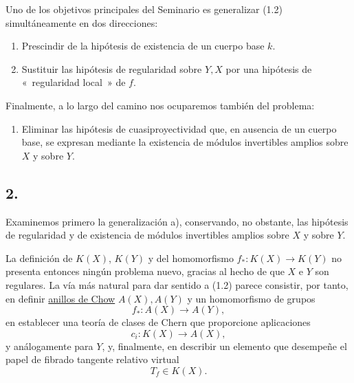 Uno de los objetivos principales del Seminario es generalizar (1.2)
simultáneamente en dos direcciones:
\begin{enumerate}[label=\alph*)]
\item Prescindir de la hipótesis de existencia de un cuerpo base $k$.
\item Sustituir las hipótesis de regularidad sobre $Y,X$ por una hipótesis de
«~regularidad local~» de $f$.
\end{enumerate}
Finalmente, a lo largo del camino nos ocuparemos también del problema:
\begin{enumerate}[label=\alph*),start=3]
\item Eliminar las hipótesis de cuasiproyectividad que, en ausencia de un
cuerpo base, se expresan mediante la existencia de módulos invertibles
amplios sobre $X$ y sobre $Y$.
\end{enumerate}

\subsection*{2.}
Examinemos primero la generalización a), conservando, no obstante, las
hipótesis de regularidad y de existencia de módulos invertibles amplios sobre
$X$ y sobre $Y$.

La definición de $K(X)$, $K(Y)$ y del homomorfismo $f_*:K(X)\to K(Y)$ no
presenta entonces ningún problema nuevo, gracias al hecho de que $X$ e $Y$
son regulares. La vía más natural para dar sentido a (1.2) parece consistir,
por tanto, en definir \underline{anillos de Chow} $A(X),A(Y)$ y un
homomorfismo de grupos
\[
f_*:A(X)\longrightarrow A(Y),
\]
en establecer una teoría de clases de Chern que proporcione aplicaciones
\[
c_i:K(X)\longrightarrow A(X),
\]
y análogamente para $Y$, y, finalmente, en describir un elemento que
desempeñe el papel de fibrado tangente relativo virtual
\[
T_f\in K(X).
\]


